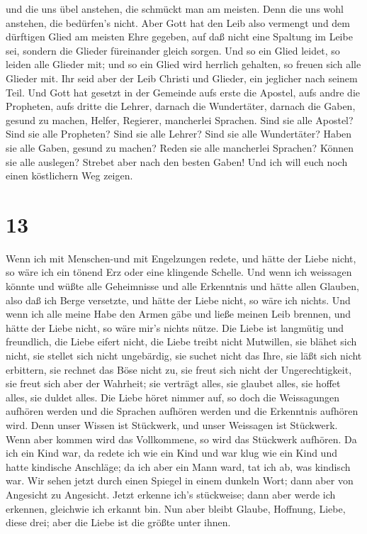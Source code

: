 und die uns übel anstehen, die schmückt man am meisten. 
Denn die uns wohl anstehen, die bedürfen's nicht. Aber Gott hat den Leib
also vermengt und dem dürftigen Glied am meisten Ehre gegeben,
 auf daß nicht eine Spaltung im Leibe sei, sondern die
Glieder füreinander gleich sorgen.  Und so ein Glied
leidet, so leiden alle Glieder mit; und so ein Glied wird herrlich
gehalten, so freuen sich alle Glieder mit.  Ihr seid aber
der Leib Christi und Glieder, ein jeglicher nach seinem Teil.
 Und Gott hat gesetzt in der Gemeinde aufs erste die
Apostel, aufs andre die Propheten, aufs dritte die Lehrer, darnach die
Wundertäter, darnach die Gaben, gesund zu machen, Helfer, Regierer,
mancherlei Sprachen.  Sind sie alle Apostel? Sind sie alle
Propheten? Sind sie alle Lehrer? Sind sie alle Wundertäter?
 Haben sie alle Gaben, gesund zu machen? Reden sie alle
mancherlei Sprachen? Können sie alle auslegen?  Strebet
aber nach den besten Gaben! Und ich will euch noch einen köstlichern Weg
zeigen.

\hypertarget{section-12}{%
\section{13}\label{section-12}}

 Wenn ich mit Menschen-und mit Engelzungen redete, und hätte
der Liebe nicht, so wäre ich ein tönend Erz oder eine klingende Schelle.
 Und wenn ich weissagen könnte und wüßte alle Geheimnisse
und alle Erkenntnis und hätte allen Glauben, also daß ich Berge
versetzte, und hätte der Liebe nicht, so wäre ich nichts. 
Und wenn ich alle meine Habe den Armen gäbe und ließe meinen Leib
brennen, und hätte der Liebe nicht, so wäre mir's nichts nütze.
 Die Liebe ist langmütig und freundlich, die Liebe eifert
nicht, die Liebe treibt nicht Mutwillen, sie blähet sich nicht,
 sie stellet sich nicht ungebärdig, sie suchet nicht das
Ihre, sie läßt sich nicht erbittern, sie rechnet das Böse nicht zu,
 sie freut sich nicht der Ungerechtigkeit, sie freut sich
aber der Wahrheit;  sie verträgt alles, sie glaubet alles,
sie hoffet alles, sie duldet alles.  Die Liebe höret nimmer
auf, so doch die Weissagungen aufhören werden und die Sprachen aufhören
werden und die Erkenntnis aufhören wird.  Denn unser Wissen
ist Stückwerk, und unser Weissagen ist Stückwerk.  Wenn
aber kommen wird das Vollkommene, so wird das Stückwerk aufhören.
 Da ich ein Kind war, da redete ich wie ein Kind und war
klug wie ein Kind und hatte kindische Anschläge; da ich aber ein Mann
ward, tat ich ab, was kindisch war.  Wir sehen jetzt durch
einen Spiegel in einem dunkeln Wort; dann aber von Angesicht zu
Angesicht. Jetzt erkenne ich's stückweise; dann aber werde ich erkennen,
gleichwie ich erkannt bin.  Nun aber bleibt Glaube,
Hoffnung, Liebe, diese drei; aber die Liebe ist die größte unter ihnen.

